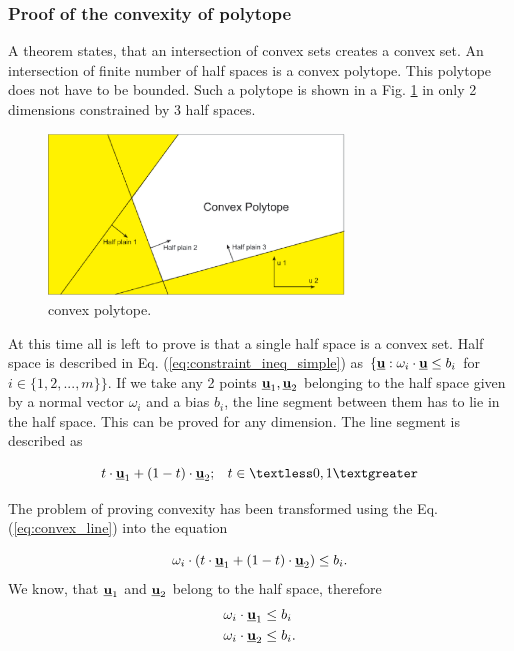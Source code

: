 \documentclass[a4paper,11pt,titlepage]{article}
\newcommand{\uvec}{\textbf{\underline{u}}}
\begin{document}
\subsubsection{Proof of the convexity of polytope}

A theorem states, that an intersection of convex sets creates a convex set. An intersection of finite number of half spaces is a convex polytope. This polytope does not have to be bounded. Such a polytope is shown in a Fig. \ref{fig:convex_polytope} in only 2 dimensions constrained by 3 half spaces.

\begin{figure}[h]
\centering
\includegraphics[width=0.7\textwidth]{fig/convex_polytope.eps} 
\caption{convex polytope.}
\label{fig:convex_polytope}
\end{figure}

At this time all is left to prove is that a single half space is a convex set. Half space is described in Eq. (\ref{eq:constraint_ineq_simple}) as $\{\uvec : \omega_i \cdot \uvec \leq b_i$ for $i \in \{1, 2, ..., m\}\}$. If we take any 2 points $\uvec_1, \uvec_2$ belonging to the half space given by a normal vector $\omega_i$ and a bias $b_i$, the line segment between them has to lie in the half space. This can be proved for any dimension. The line segment is described as

\begin{equation}
\label{eq:convex_line}
t \cdot \uvec_1 + (1-t) \cdot \uvec_2; \;\;\; t \in \textless 0, 1 \textgreater
\end{equation}

The problem of proving convexity has been transformed using the Eq. (\ref{eq:convex_line}) into the equation 

\begin{equation}
\label{eq:convex_u_proof}
\omega_i \cdot (t \cdot \uvec_1 + (1-t) \cdot \uvec_2) \leq b_i.
\end{equation}
We know, that $\uvec_1$ and $\uvec_2$ belong to the half space, therefore 
\begin{equation}
\begin{split}
\omega_i \cdot \uvec_1 &\leq b_i\\
\omega_i \cdot \uvec_2 &\leq b_i.
\end{split}
\end{equation}
\end{document}
